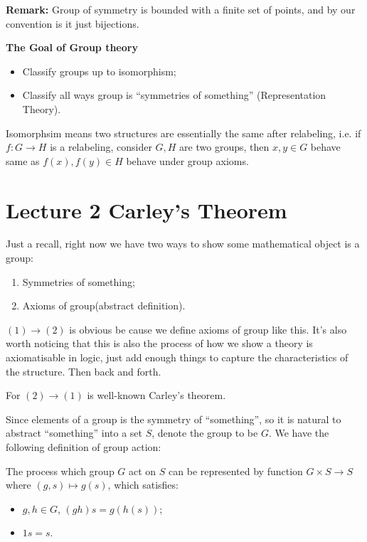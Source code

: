 \documentclass[11pt]{article}
\begin{document}
\textbf{Remark:} Group of symmetry is bounded with a finite set of points, and by our convention is it just bijections.

\textbf{The Goal of Group theory}
\begin{itemize}
\item Classify groups up to isomorphism;
\item Classify all ways group is ``symmetries of something'' (Representation Theory).
\end{itemize}

\begin{definition}
Isomorphsim means two structures are essentially the same after relabeling, i.e. if \(f : G \to H\) is a relabeling, consider \(G, H\) are two groups, then \(x,y \in G\) behave same as \(f(x), f(y) \in H\) behave under group axioms.
\end{definition}
\section{Lecture 2 Carley's Theorem}
\label{sec:org9af047a}

Just a recall, right now we have two ways to show some mathematical object is a group:
\begin{enumerate}
\item Symmetries of something;
\item Axioms of group(abstract definition).
\end{enumerate}

\((1) \to (2)\) is obvious be cause we define axioms of group like this. It's also worth noticing that this is also the process of how we show a theory is axiomatisable in logic, just add enough things to capture the characteristics of the structure. Then back and forth.

For \((2) \to (1)\) is well-known Carley's theorem.

Since elements of a group is the symmetry of ``something'', so it is natural to abstract ``something'' into a set \(S\), denote the group to be \(G\). We have the following definition of group action:

\begin{definition}
The process which group \(G\) act on \(S\) can be represented by function \(G \times S \to S\) where \((g,s) \mapsto g(s)\), which satisfies:
\begin{itemize}
\item \(g, h \in G\), \((gh)s = g(h(s))\);
\item \(1s = s\).
\end{itemize}
\end{definition}
\end{document}

